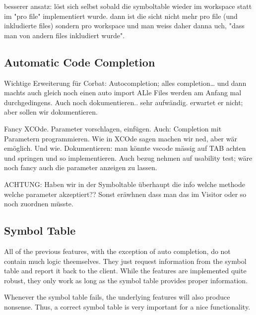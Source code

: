 besserer ansatz: löst sich selbst sobald die symboltable wieder im workspace statt im "pro file"
implementiert wurde. dann ist die sicht nicht mehr pro file (und inkludierte files) sondern pro workspace
und man weiss daher danna uch, "dass man von andern files inkludiert wurde". 

\subsection{Automatic Code Completion}
Wichtige Erweiterung für Corbat:
Autocompletion; alles completion… und dann machts auch gleich noch einen auto import
ALle Files werden am Anfang mal durchgedingens.
Auch noch dokumentieren.. sehr aufwändig. erwartet er nicht; aber sollen wir dokumentieren.

Fancy XCOde. Parameter vorschlagen, einfügen.
Auch: Completion mit Parametern programmieren. Wie in XCOde sagen machen wir ned, aber wär emöglich. Und wie.
Dokumentieren: man könnte vscode mässig auf TAB achten und springen und so implementieren.
Auch bezug nehmen auf usability test; wäre noch fancy auch die parameter anzeigen zu lassen.

ACHTUNG: Haben wir in der Symboltable überhaupt die info welche methode welche parameter akzeptiert??
Sonst eräwhnen dass man das im Visitor oder so noch zuordnen müsste.

\subsection{Symbol Table}
All of the previous features, with the exception of auto completion, do not contain much logic theemselves.
They just request information from the symbol table and report it back to the client.
While the features are implemented quite robust, they only work as long as the symbol table provides proper information.

Whenever the symbol table fails, the underlying features will also produce nonsense.
Thus, a correct symbol table is very important for a nice functionality.

